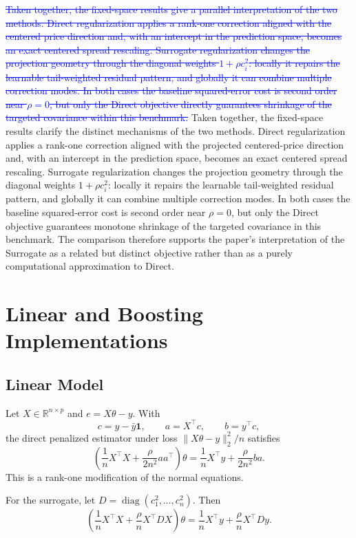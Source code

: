 \documentclass[10pt]{article}
\theoremstyle{definition}
\newcommand{\R}{\mathbb{R}}
\newcommand{\diag}{\operatorname{diag}}
\newcommand{\1}{\mathbf{1}}
\newcommand{\oldtext}[1]{\textcolor{blue}{\sout{#1}}}
\newcommand{\newtext}[1]{\textcolor{impGreen}{#1}}
\begin{document}
{\color{impGreen}
\oldtext{Taken together, the fixed-space results give a parallel interpretation of the two methods. Direct regularization applies a rank-one correction aligned with the centered price direction and, with an intercept in the prediction space, becomes an exact centered spread rescaling. Surrogate regularization changes the projection geometry through the diagonal weights $1+\rho c_i^2$: locally it repairs the learnable tail-weighted residual pattern, and globally it can combine multiple correction modes. In both cases the baseline squared-error cost is second order near $\rho=0$, but only the Direct objective directly guarantees shrinkage of the targeted covariance within this benchmark.}
\newtext{Taken together, the fixed-space results clarify the distinct mechanisms of the two methods. Direct regularization applies a rank-one correction aligned with the projected centered-price direction and, with an intercept in the prediction space, becomes an exact centered spread rescaling. Surrogate regularization changes the projection geometry through the diagonal weights $1+\rho c_i^2$: locally it repairs the learnable tail-weighted residual pattern, and globally it can combine multiple correction modes. In both cases the baseline squared-error cost is second order near $\rho=0$, but only the Direct objective guarantees monotone shrinkage of the targeted covariance in this benchmark. The comparison therefore supports the paper's interpretation of the Surrogate as a related but distinct objective rather than as a purely computational approximation to Direct.}
}

\section{Linear and Boosting Implementations}
\label{app:implementation}


\subsection{Linear Model}

Let $X\in\R^{n\times p}$ and $e=X\theta-y$. With
\[
c=y-\bar y\1,\qquad a=X^\top c,\qquad b=y^\top c,
\]
the direct penalized estimator under loss $\|X\theta-y\|_2^2/n$ satisfies
\[
\left(
\frac{1}{n}X^\top X+\frac{\rho}{2n^2}aa^\top
\right)\theta
=
\frac{1}{n}X^\top y+\frac{\rho}{2n^2}ba.
\]
This is a rank-one modification of the normal equations.

For the surrogate, let $D=\diag(c_1^2,\ldots,c_n^2)$. Then
\[
\left(
\frac{1}{n}X^\top X+\frac{\rho}{n}X^\top DX
\right)\theta
=
\frac{1}{n}X^\top y+\frac{\rho}{n}X^\top Dy.
\]
\end{document}
